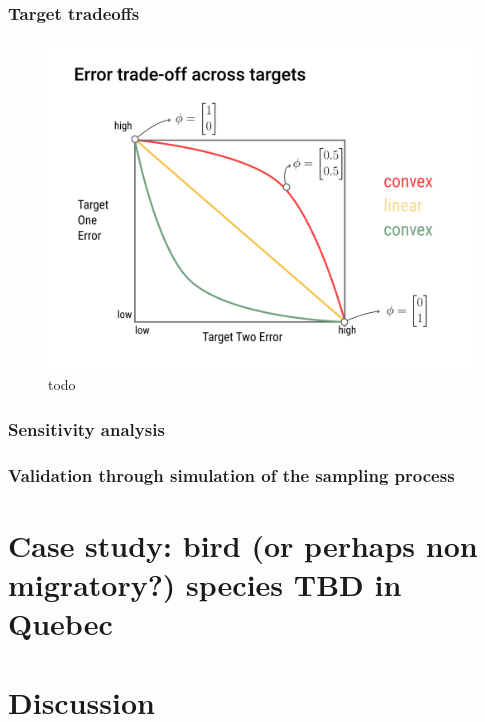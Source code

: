 \documentclass[10pt,oneside]{article}
\makeatletter
\def\maxwidth{\ifdim\Gin@nat@width>\linewidth\linewidth
\else\Gin@nat@width\fi}
\let\Oldincludegraphics\includegraphics
\renewcommand{\includegraphics}[1]{\Oldincludegraphics[width=\maxwidth]{#1}}
\makeatother
\begin{document}
\hypertarget{target-tradeoffs}{%
\subsubsection{Target tradeoffs}\label{target-tradeoffs}}

\begin{figure}
\hypertarget{fig:tradeoff}{%
\centering
\includegraphics{./figures/tradeoff_concept.png}
\caption{todo}\label{fig:tradeoff}
}
\end{figure}

\hypertarget{sensitivity-analysis}{%
\subsubsection{Sensitivity analysis}\label{sensitivity-analysis}}

\hypertarget{validation-through-simulation-of-the-sampling-process}{%
\subsubsection{Validation through simulation of the sampling
process}\label{validation-through-simulation-of-the-sampling-process}}

\hypertarget{case-study-bird-or-perhaps-non-migratory-species-tbd-in-quebec}{%
\section{Case study: bird (or perhaps non migratory?) species TBD in
Quebec}\label{case-study-bird-or-perhaps-non-migratory-species-tbd-in-quebec}}

\hypertarget{discussion}{%
\section{Discussion}\label{discussion}}
\end{document}
